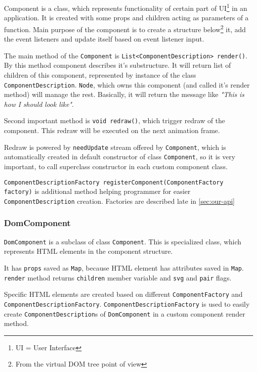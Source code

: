 \documentclass[oneside, 12pt]{book}
\newcommand*{\fullref}[1]{\hyperref[{#1}]{\autoref*{#1} \nameref*{#1}}}
\begin{document}
      Component is a class, which represents functionality of certain part of UI\footnote{UI = User Interface} in an application.
      It is created with some props and children acting as parameters of a function. 
      Main purpose of the component is to create a structure below\footnote{From the virtual DOM tree point of view} it, 
      add the event listeners and update itself based on event listener input.

      The main method of the \texttt{Component} is \texttt{List<ComponentDescription> render()}. 
      By this method component describes it's substructure.
      It will return list of children of this component, represented by instance of the class \texttt{ComponentDescription}. 
      \texttt{Node}, which owns this component (and called it's render method) will manage the rest.
      Basically, it will return the message like \textit{"This is how I should look like"}.

      Second important method is \texttt{void redraw()}, which trigger redraw of the component. 
      This redraw will be executed on the next animation frame. 

      Redraw is powered by \texttt{needUpdate} stream offered by \texttt{Component}, 
      which is automatically created in default constructor of class \texttt{Component}, 
      so it is very important, to call superclass constructor in each custom component class.

			\texttt{ComponentDescriptionFactory registerComponent(ComponentFactory factory)} is additional method helping programmer 
			for easier \texttt{ComponentDescription} creation. 
			Factories are described late in \fullref{sec:our-api}
      
    \subsubsection{DomComponent}\label{subsubsec:our-architecture-core-dom-component}
      \texttt{DomComponent} is a subclass of class \texttt{Component}. 
      This is specialized class, which represents HTML elements in the component structure.

      It has \texttt{props} saved as \texttt{Map}, because HTML element has attributes saved in \texttt{Map}.
      \texttt{render} method returns \texttt{children} member variable and \texttt{svg} and \texttt{pair} flags.

      Specific HTML elements are created based on different \texttt{ComponentFactory} and \texttt{ComponentDescriptionFactory}.
      \texttt{ComponentDescriptionFactory} is used to easily create \texttt{ComponentDescription}s of \texttt{DomComponent} in a custom component render method. 
\end{document}
